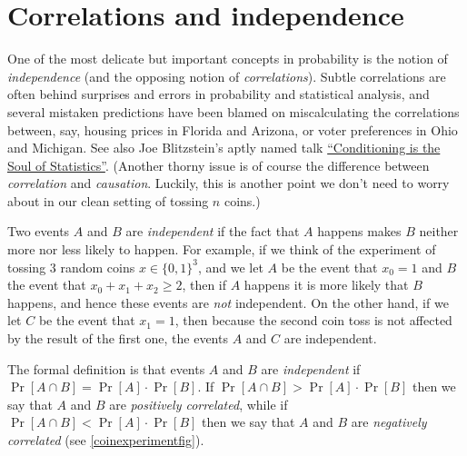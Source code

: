 \section{Correlations and
independence}\label{Correlations-and-independence}

One of the most delicate but important concepts in probability is the
notion of \emph{independence} (and the opposing notion of
\emph{correlations}). Subtle correlations are often behind surprises and
errors in probability and statistical analysis, and several mistaken
predictions have been blamed on miscalculating the correlations between,
say, housing prices in Florida and Arizona, or voter preferences in Ohio
and Michigan. See also Joe Blitzstein's aptly named talk
\href{https://youtu.be/dzFf3r1yph8}{``Conditioning is the Soul of
Statistics''}. (Another thorny issue is of course the difference between
\emph{correlation} and \emph{causation}. Luckily, this is another point
we don't need to worry about in our clean setting of tossing \(n\)
coins.)

Two events \(A\) and \(B\) are \emph{independent} if the fact that \(A\)
happens makes \(B\) neither more nor less likely to happen. For example,
if we think of the experiment of tossing \(3\) random coins
\(x\in \{0,1\}^3\), and we let \(A\) be the event that \(x_0=1\) and
\(B\) the event that \(x_0 + x_1 + x_2 \geq 2\), then if \(A\) happens
it is more likely that \(B\) happens, and hence these events are
\emph{not} independent. On the other hand, if we let \(C\) be the event
that \(x_1=1\), then because the second coin toss is not affected by the
result of the first one, the events \(A\) and \(C\) are independent.

The formal definition is that events \(A\) and \(B\) are
\emph{independent} if \(\Pr[A \cap B]=\Pr[A] \cdot \Pr[B]\). If
\(\Pr[A \cap B] > \Pr[A]\cdot \Pr[B]\) then we say that \(A\) and \(B\)
are \emph{positively correlated}, while if
\(\Pr[ A \cap B] < \Pr[A] \cdot \Pr[B]\) then we say that \(A\) and
\(B\) are \emph{negatively correlated} (see \cref{coinexperimentfig}).

